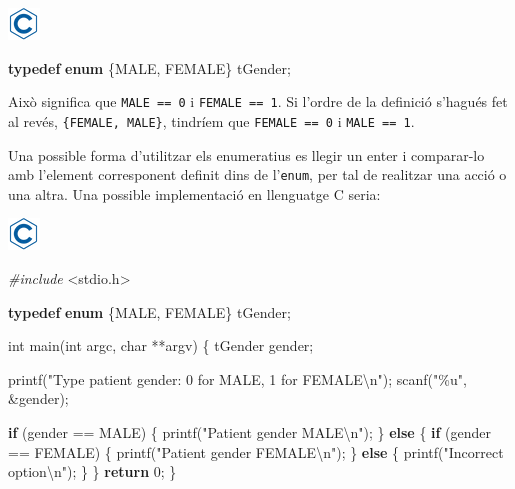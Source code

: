 \documentclass[
]{book}
\newenvironment{Shaded}{\begin{snugshade}}{\end{snugshade}}
\newcommand{\ControlFlowTok}[1]{\textcolor[rgb]{0.13,0.29,0.53}{\textbf{#1}}}
\newcommand{\DataTypeTok}[1]{\textcolor[rgb]{0.13,0.29,0.53}{#1}}
\newcommand{\DecValTok}[1]{\textcolor[rgb]{0.00,0.00,0.81}{#1}}
\newcommand{\ImportTok}[1]{#1}
\newcommand{\KeywordTok}[1]{\textcolor[rgb]{0.13,0.29,0.53}{\textbf{#1}}}
\newcommand{\NormalTok}[1]{#1}
\newcommand{\PreprocessorTok}[1]{\textcolor[rgb]{0.56,0.35,0.01}{\textit{#1}}}
\newcommand{\SpecialCharTok}[1]{\textcolor[rgb]{0.00,0.00,0.00}{#1}}
\newcommand{\StringTok}[1]{\textcolor[rgb]{0.31,0.60,0.02}{#1}}
\begin{document}
\includegraphics{./img/c.png}

\begin{Shaded}
\begin{Highlighting}[]
\KeywordTok{typedef} \KeywordTok{enum}\NormalTok{ \{MALE, FEMALE\} tGender;}
\end{Highlighting}
\end{Shaded}

Això significa que \texttt{MALE\ ==\ 0} i \texttt{FEMALE\ ==\ 1}. Si l'ordre de la definició s'hagués fet al revés, \texttt{\{FEMALE,\ MALE\}}, tindríem que \texttt{FEMALE\ ==\ 0} i \texttt{MALE\ ==\ 1}.

Una possible forma d'utilitzar els enumeratius es llegir un enter i comparar-lo amb l'element corresponent definit dins de l'\texttt{enum}, per tal de realitzar una acció o una altra. Una possible implementació en llenguatge C seria:

\includegraphics{./img/c.png}

\begin{Shaded}
\begin{Highlighting}[]
\PreprocessorTok{\#include }\ImportTok{\textless{}stdio.h\textgreater{}}

\KeywordTok{typedef} \KeywordTok{enum}\NormalTok{ \{MALE, FEMALE\} tGender;}

\DataTypeTok{int}\NormalTok{ main(}\DataTypeTok{int}\NormalTok{ argc, }\DataTypeTok{char}\NormalTok{ **argv) \{}
\NormalTok{    tGender gender;}

\NormalTok{    printf(}\StringTok{"Type patient gender: 0 for MALE, 1 for FEMALE}\SpecialCharTok{\textbackslash{}n}\StringTok{"}\NormalTok{);}
\NormalTok{    scanf(}\StringTok{"\%u"}\NormalTok{, \&gender);}

    \ControlFlowTok{if}\NormalTok{ (gender == MALE) \{}
\NormalTok{        printf(}\StringTok{"Patient gender MALE}\SpecialCharTok{\textbackslash{}n}\StringTok{"}\NormalTok{);}
\NormalTok{    \} }\ControlFlowTok{else}\NormalTok{ \{}
        \ControlFlowTok{if}\NormalTok{ (gender == FEMALE) \{}
\NormalTok{            printf(}\StringTok{"Patient gender FEMALE}\SpecialCharTok{\textbackslash{}n}\StringTok{"}\NormalTok{);}
\NormalTok{        \} }\ControlFlowTok{else}\NormalTok{ \{}
\NormalTok{            printf(}\StringTok{"Incorrect option}\SpecialCharTok{\textbackslash{}n}\StringTok{"}\NormalTok{);}
\NormalTok{        \}}
\NormalTok{    \}}
    \ControlFlowTok{return} \DecValTok{0}\NormalTok{;}
\NormalTok{\}}
\end{Highlighting}
\end{Shaded}
\end{document}
